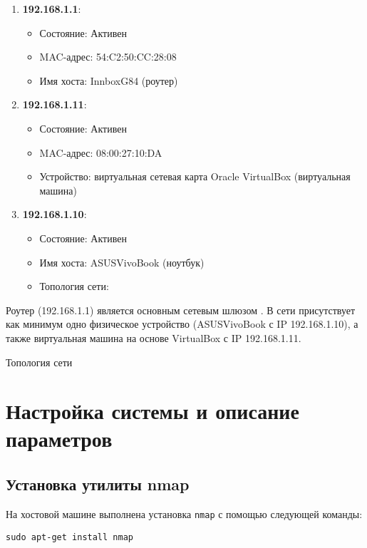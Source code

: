 \begin{enumerate}
	\item \textbf{192.168.1.1}:
	\begin{itemize}
		\item Состояние: Активен
		\item MAC-адрес: 54:C2:50:CC:28:08
		\item Имя хоста: InnboxG84 (роутер)
	\end{itemize}
	\item \textbf{192.168.1.11}:
	\begin{itemize}
		\item Состояние: Активен
		\item MAC-адрес: 08:00:27:10:DA
		\item Устройство:
			виртуальная сетевая карта Oracle VirtualBox
			(виртуальная машина)
	\end{itemize}
	\item \textbf{192.168.1.10}:
	\begin{itemize}
		\item Состояние: Активен
		\item Имя хоста: ASUSVivoBook (ноутбук)
		\item Топология сети:
	\end{itemize}
\end{enumerate}

Роутер (192.168.1.1) является основным сетевым шлюзом .
В сети присутствует как минимум одно физическое устройство
(ASUSVivoBook с IP 192.168.1.10),
а также виртуальная машина на основе VirtualBox с IP 192.168.1.11.

\begin{image}
    \caption{Топология сети}
    \label{fig:topology}
\end{image}

\section{Настройка системы и описание параметров}

\subsection{Установка утилиты nmap}

На хостовой машине выполнена установка \texttt{nmap}
с помощью следующей команды:

\begin{verbatim}
sudo apt-get install nmap
\end{verbatim}

